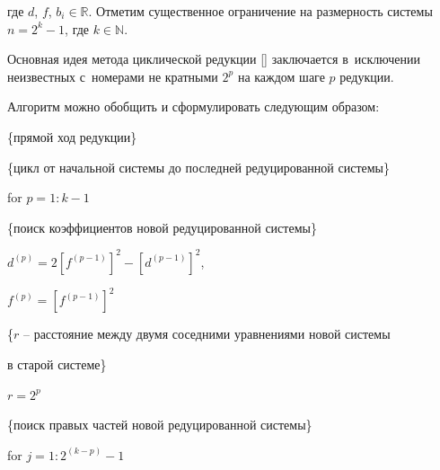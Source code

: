 где $d$, $f$, $b_i \in \mathbb R$. Отметим существенное ограничение на размерность системы $n=2^k-1$, где $k\in \mathbb N$.



Основная идея метода циклической редукции [] заключается в~исключении неизвестных с~номерами не кратными $2^{p}$ на каждом шаге $p$ редукции.

Алгоритм можно обобщить и сформулировать следующим образом:



\vspace{3mm}



{\tt \footnotesize



\{прямой ход редукции\} 



\{цикл от начальной системы до последней редуцированной системы\}



for $p=1:k-1$



\hspace{.5cm}

\{поиск коэффициентов новой редуцированной системы\} 



\hspace{.5cm}

$d^{(p)}=2[f^{(p-1)}]^2-[d^{(p-1)}]^2 $, 



\hspace{.5cm} 

$f^{(p)}=[f^{(p-1)}]^2$



\hspace{.5cm}

\{$r$ -- расстояние между двумя соседними уравнениями новой системы



\hspace{.5cm} в старой системе\} 



\hspace{.5cm} $r=2^p$



\hspace{.5cm} \{поиск правых частей новой редуцированной системы\}



\hspace{.5cm} \hspace{.5cm} for $j=1:2^{(k-p)}-1$



}
